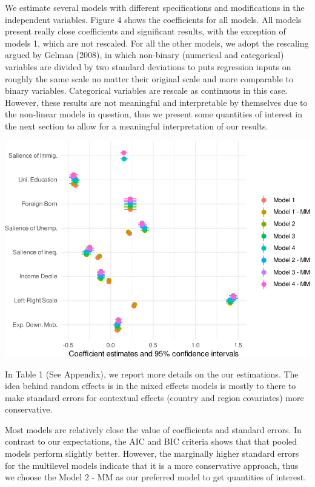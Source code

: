 \documentclass[
  11pt,
]{article}
\begin{document}
We estimate several models with different specifications and
modifications in the independent variables. Figure 4 shows the
coefficients for all models. All models present really close
coefficients and significant results, with the exception of models 1,
which are not rescaled. For all the other models, we adopt the rescaling
argued by Gelman (2008), in which non-binary (numerical and categorical)
variables are divided by two standard deviations to puts regression
inputs on roughly the same scale no matter their original scale and more
comparable to binary variables. Categorical variables are rescale as
continuous in this case. However, these results are not meaningful and
interpretable by themselves due to the non-linear models in question,
thus we present some quantities of interest in the next section to allow
for a meaningful interpretation of our results.

\vspace{0.4cm}

\includegraphics{AQM-paper_files/figure-latex/modelplot-1.pdf}
\vspace{0.4cm}

In Table 1 (See Appendix), we report more details on the our
estimations. The idea behind random effects is in the mixed effects
models is mostly to there to make standard errors for contextual effects
(country and region covariates) more conservative.

Most models are relatively close the value of coefficients and standard
errors. In contrast to our expectations, the AIC and BIC criteria shows
that that pooled models perform slightly better. However, the marginally
higher standard errors for the multilevel models indicate that it is a
more conservative approach, thus we choose the Model 2 - MM as our
preferred model to get quantities of interest.
\end{document}
